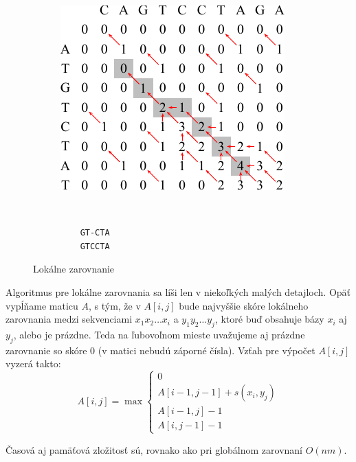 \begin{figure}[htp]
    \centering
    \begin{subfigure}[m]{0.5\textwidth}    
    \centering
    \includegraphics[width=\textwidth]{images/local_alignment}
    \end{subfigure}    
    ~
    \begin{subfigure}[m]{0.3\textwidth}    
    \centering
    \begin{verbatim}
    GT-CTA
    GTCCTA
    \end{verbatim}
    \end{subfigure}
    \caption{Lokálne zarovnanie}
    \label{fig:global_align}
\end{figure}

Algoritmus pre lokálne zarovnania sa líši len v niekoľkých malých detajloch. Opäť vypĺňame maticu $A$, s tým, že v $A[i,j]$ bude najvyššie skóre lokálneho zarovnania medzi sekvenciami $x_1x_2\dots x_i$ a $y_1y_2\dots y_j$, ktoré buď obsahuje bázy $x_i$ aj $y_j$, alebo je prázdne. Teda na ľubovoľnom mieste uvažujeme aj prázdne zarovnanie so skóre 0 (v matici nebudú záporné čísla). Vzťah pre výpočet $A[i,j]$ vyzerá takto:
$$A[i,j] = \max \left\{ 
\begin{array}{l}
0\\
A[i-1,j-1]+s(x_i, y_j)\\ 
A[i-1,j]-1\\
A[i,j-1]-1 
\end{array} \right.$$

Časová aj pamäťová zložitosť sú, rovnako ako pri globálnom zarovnaní $O(nm)$.

